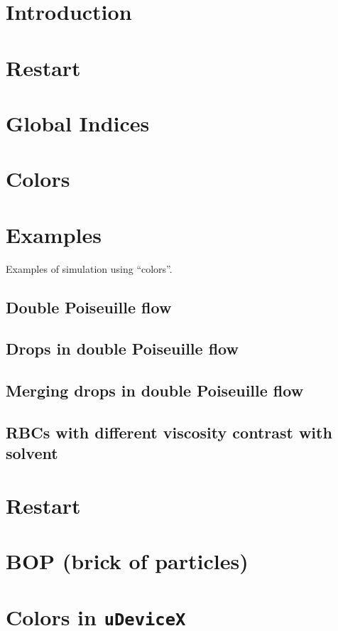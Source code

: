 \documentclass{article}
\begin{document}
\maketitle

\section{Introduction}


\section{Restart}


\section{Global Indices}


\section{Colors}


\section{Examples}
Examples of simulation using ``colors''.

\subsection{Double Poiseuille flow}


\subsection{Drops in double Poiseuille flow}


\subsection{Merging drops in double Poiseuille flow}


\subsection{RBCs with different viscosity contrast with solvent}


\appendix
\section{Restart}\label{a:restart}


\section{BOP (brick of particles)}\label{a:bop}


\section{Colors in \texttt{uDeviceX}}\label{a:color}

\end{document}
